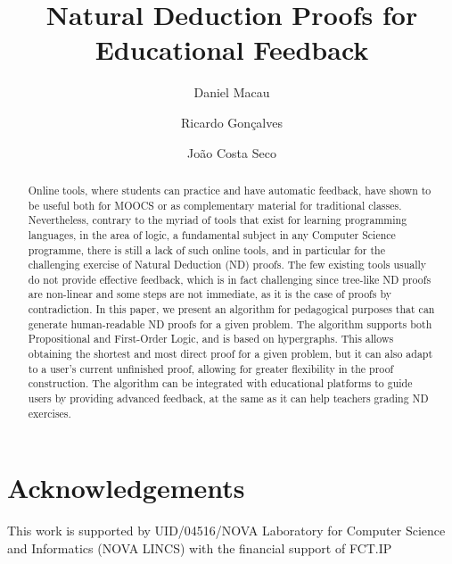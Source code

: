 \documentclass[runningheads]{llncs}
\begin{document}
\title{Natural Deduction Proofs for Educational Feedback}

\author{Daniel Macau
\and Ricardo Gonçalves
\and João Costa Seco}


\maketitle 

\begin{abstract}
Online tools, where students can practice and have automatic feedback, have shown to be useful both for MOOCS or as complementary material for traditional classes. Nevertheless, contrary to the myriad of tools that exist for learning programming languages, in the area of logic, a fundamental subject in any Computer Science programme, there is still a lack of such online tools, and in particular for the challenging exercise of Natural Deduction (ND) proofs. The few existing tools usually do not provide effective feedback, which is in fact challenging since tree-like ND proofs are non-linear and some steps are not immediate, as it is the case of proofs by contradiction. In this paper, we present an algorithm for pedagogical purposes that can generate human-readable ND proofs for a given problem. The algorithm supports both Propositional and First-Order Logic, and is based on hypergraphs. This allows obtaining the shortest and most direct proof for a given problem, but it can also adapt to a user’s current unfinished proof, allowing for greater flexibility in the proof construction. The algorithm can be integrated with educational platforms to guide users by providing advanced feedback, at the same as it can help teachers grading ND exercises. 

\end{abstract}





%



\section*{Acknowledgements}
This work is supported by UID/04516/NOVA Laboratory for Computer Science and Informatics (NOVA LINCS) with the financial support of FCT.IP


\end{document}
